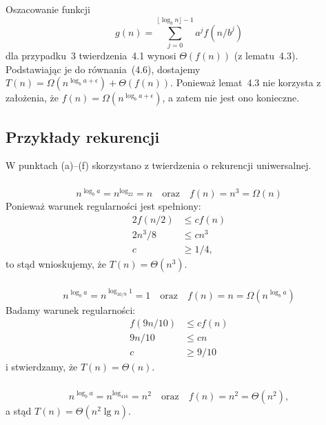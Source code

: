 \subsection{} %
Oszacowanie funkcji
\[
	g(n) = \sum_{j=0}^{\lfloor\log_bn\rfloor-1}a^jf(n/b^j)
\]
dla przypadku~3 twierdzenia~4.1 wynosi $\Theta(f(n))$ (z lematu~4.3). Podstawiając je do równania~(4.6), dostajemy $T(n)=\Omega(n^{\log_ba+\epsilon})+\Theta(f(n))$. 
Ponieważ lemat~4.3 nie korzysta z założenia, że $f(n)=\Omega(n^{\log_ba+\epsilon})$, a zatem nie jest ono konieczne.

\problems

\subsection{Przykłady rekurencji} %
W punktach (a)\nobreakdash--(f) skorzystano z twierdzenia o rekurencji uniwersalnej.

\subsubsection{} %
\[
	n^{\log_ba} = n^{\log_22} = n \quad\text{oraz}\quad f(n) = n^3 = \Omega(n)
\]
Ponieważ warunek regularności jest spełniony:
\begin{align*}
	2f(n/2) &\le cf(n) \\
	2n^3\!/8 &\le cn^3 \\
	c &\ge 1/4,
\end{align*}
to stąd wnioskujemy, że $T(n)=\Theta(n^3)$.

\subsubsection{} %
\[
	n^{\log_ba} = n^{\log_{10/9}1} = 1 \quad\text{oraz}\quad f(n) = n = \Omega(n^{\log_ba})
\]
Badamy warunek regularności:
\begin{align*}
	f(9n/10) &\le cf(n) \\
	9n/10 &\le cn \\
	c &\ge 9/10
\end{align*}
i stwierdzamy, że $T(n)=\Theta(n)$.

\subsubsection{} %
\[
	n^{\log_ba} = n^{\log_416} = n^2 \quad\text{oraz}\quad f(n) = n^2 = \Theta(n^2),
\]
a stąd $T(n)=\Theta(n^2\lg n)$.

